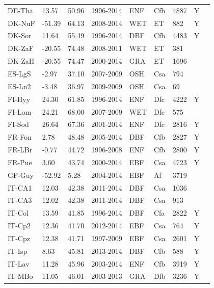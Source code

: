 \documentclass{myreport}
\begin{document}
\begin{longtable}{lllllllll}
  DE-Tha & 13.57 & 50.96 & 1996-2014 & ENF & Cfb & 4887 & Y & \cite{DE-Tha} \\ 
  DK-NuF & -51.39 & 64.13 & 2008-2014 & WET & ET & 882 & Y & \cite{DK-NuF} \\ 
  DK-Sor & 11.64 & 55.49 & 1996-2014 & DBF & Cfb & 4483 & Y & \cite{DK-Sor} \\ 
  DK-ZaF & -20.55 & 74.48 & 2008-2011 & WET & ET & 381 &  & \cite{DK-ZaF} \\ 
  DK-ZaH & -20.55 & 74.47 & 2000-2014 & GRA & ET & 1696 &  & \cite{DK-ZaH} \\ 
  ES-LgS & -2.97 & 37.10 & 2007-2009 & OSH & Csa & 794 &  & \cite{ES-LgS} \\ 
  ES-Ln2 & -3.48 & 36.97 & 2009-2009 & OSH & Csa &  69 &  & \cite{ES-Ln2} \\ 
  FI-Hyy & 24.30 & 61.85 & 1996-2014 & ENF & Dfc & 4222 & Y & \cite{FI-Hyy} \\ 
  FI-Lom & 24.21 & 68.00 & 2007-2009 & WET & Dfc & 575 &  & \cite{FI-Lom} \\ 
  FI-Sod & 26.64 & 67.36 & 2001-2014 & ENF & Dfc & 2816 & Y & \cite{FI-Sod} \\ 
  FR-Fon & 2.78 & 48.48 & 2005-2014 & DBF & Cfb & 2827 & Y & \cite{FR-Fon} \\ 
  FR-LBr & -0.77 & 44.72 & 1996-2008 & ENF & Cfb & 2800 & Y & \cite{FR-LBr} \\ 
  FR-Pue & 3.60 & 43.74 & 2000-2014 & EBF & Csa & 4723 & Y & \cite{FR-Pue} \\ 
  GF-Guy & -52.92 & 5.28 & 2004-2014 & EBF & Af & 3719 &  & \cite{GF-Guy} \\ 
  IT-CA1 & 12.03 & 42.38 & 2011-2014 & DBF & Csa & 1036 &  & \cite{IT-CA1} \\ 
  IT-CA3 & 12.02 & 42.38 & 2011-2014 & DBF & Csa & 913 &  & \cite{IT-CA3} \\ 
  IT-Col & 13.59 & 41.85 & 1996-2014 & DBF & Cfa & 2822 & Y & \cite{IT-Col} \\ 
  IT-Cp2 & 12.36 & 41.70 & 2012-2014 & EBF & Csa & 764 & Y & \cite{IT-Cp2} \\ 
  IT-Cpz & 12.38 & 41.71 & 1997-2009 & EBF & Csa & 2601 & Y & \cite{IT-Cpz} \\ 
  IT-Isp & 8.63 & 45.81 & 2013-2014 & DBF & Cfb & 588 & Y & \cite{IT-Isp} \\ 
  IT-Lav & 11.28 & 45.96 & 2003-2014 & ENF & Cfb & 3919 & Y & \cite{IT-Lav} \\ 
  IT-MBo & 11.05 & 46.01 & 2003-2013 & GRA & Dfb & 3236 & Y & \cite{IT-MBo} \\ 

\end{longtable}
\end{document}
